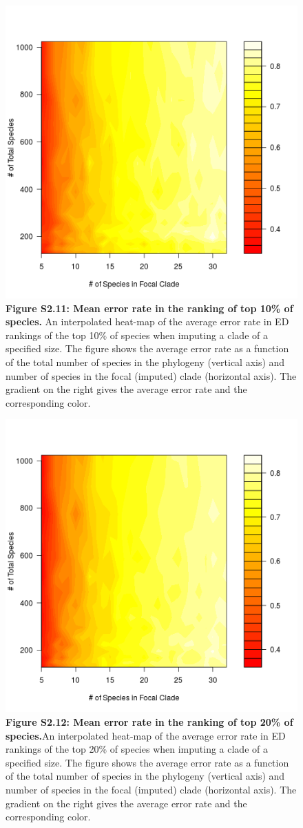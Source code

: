 \documentclass[10pt,english]{article}
\begin{document}
\begin{figure}[!ht]
  \center
  \includegraphics[width=.5\textwidth]{../figures/errorRate10pct.png}
  \caption*{\textbf{Figure S2.11: Mean error rate in the ranking of top 10\% of
  species.} An interpolated heat-map of the average error rate in ED rankings of
  the top 10\% of species when imputing a clade of a specified size. The figure
  shows the average error rate as a function of the total number of species in
  the phylogeny (vertical axis) and number of species in the focal (imputed)
  clade (horizontal axis). The gradient on the right gives the average error
  rate and the corresponding color.}
\end{figure}

\begin{figure}[!ht]
  \center
  \includegraphics[width=.5\textwidth]{../figures/errorRate20pct.png}
  \caption*{\textbf{Figure S2.12: Mean error rate in the ranking of top 20\% of
  species.}An interpolated heat-map of the average error rate in ED rankings of
  the top 20\% of species when imputing a clade of a specified size. The figure
  shows the average error rate as a function of the total number of species in
  the phylogeny (vertical axis) and number of species in the focal (imputed)
  clade (horizontal axis). The gradient on the right gives the average error
  rate and the corresponding color.}
\end{figure}
\clearpage
\end{document}
